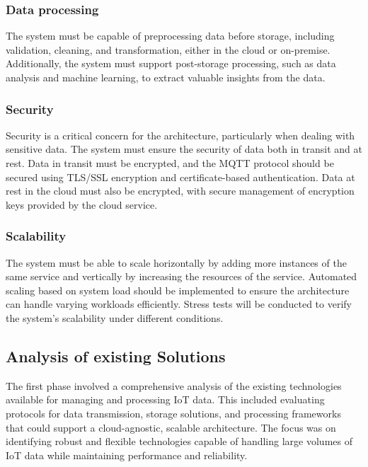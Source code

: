\subsubsection{Data processing}
\label{sec:data-processing}
The system must be capable of preprocessing data before storage, including validation, cleaning, and transformation, either in the cloud or on-premise. Additionally, the system must support post-storage processing, such as data analysis and machine learning, to extract valuable insights from the data.

\subsubsection{Security}
\label{sec:security}
Security is a critical concern for the architecture, particularly when dealing with sensitive data. The system must ensure the security of data both in transit and at rest. Data in transit must be encrypted, and the MQTT protocol should be secured using TLS/SSL encryption and certificate-based authentication. Data at rest in the cloud must also be encrypted, with secure management of encryption keys provided by the cloud service.

\subsubsection{Scalability}
The system must be able to scale horizontally by adding more instances of the same service and vertically by increasing the resources of the service. Automated scaling based on system load should be implemented to ensure the architecture can handle varying workloads efficiently. Stress tests will be conducted to verify the system's scalability under different conditions.




\subsection{Analysis of existing Solutions}
\label{sec:analysis-of-existing-solutions}
The first phase involved a comprehensive analysis of the existing technologies available for managing and processing IoT data. This included evaluating protocols for data transmission, storage solutions, and processing frameworks that could support a cloud-agnostic, scalable architecture. The focus was on identifying robust and flexible technologies capable of handling large volumes of IoT data while maintaining performance and reliability.

